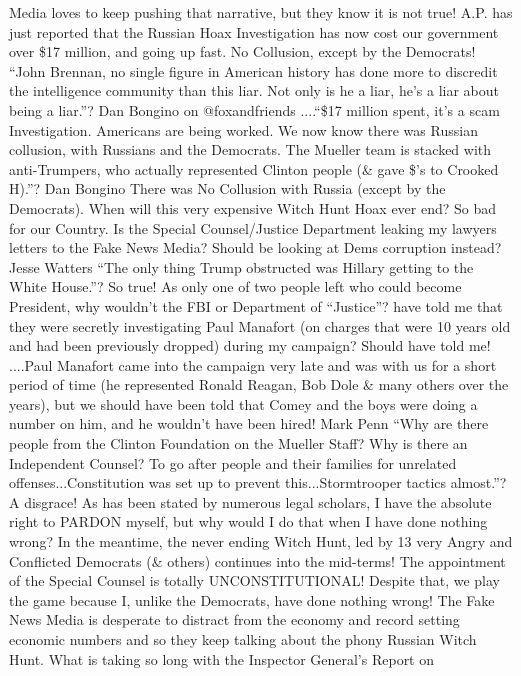 Media loves to keep pushing that narrative, but they know it is not
true! A.P. has just reported that the Russian Hoax Investigation has now
cost our government over \$17 million, and going up fast. No Collusion,
except by the Democrats! ``John Brennan, no single figure in American
history has done more to discredit the intelligence community than this
liar. Not only is he a liar, he's a liar about being a liar.''? Dan
Bongino on @foxandfriends ....``\$17 million spent, it's a scam
Investigation. Americans are being worked. We now know there was Russian
collusion, with Russians and the Democrats. The Mueller team is stacked
with anti-Trumpers, who actually represented Clinton people (\& gave
\$'s to Crooked H).''? Dan Bongino There was No Collusion with Russia
(except by the Democrats). When will this very expensive Witch Hunt Hoax
ever end? So bad for our Country. Is the Special Counsel/Justice
Department leaking my lawyers letters to the Fake News Media? Should be
looking at Dems corruption instead? Jesse Watters ``The only thing Trump
obstructed was Hillary getting to the White House.''? So true! As only
one of two people left who could become President, why wouldn't the FBI
or Department of ``Justice''? have told me that they were secretly
investigating Paul Manafort (on charges that were 10 years old and had
been previously dropped) during my campaign? Should have told me!
....Paul Manafort came into the campaign very late and was with us for a
short period of time (he represented Ronald Reagan, Bob Dole \& many
others over the years), but we should have been told that Comey and the
boys were doing a number on him, and he wouldn't have been hired! Mark
Penn ``Why are there people from the Clinton Foundation on the Mueller
Staff? Why is there an Independent Counsel? To go after people and their
families for unrelated offenses...Constitution was set up to prevent
this...Stormtrooper tactics almost.''? A disgrace! As has been stated by
numerous legal scholars, I have the absolute right to PARDON myself, but
why would I do that when I have done nothing wrong? In the meantime, the
never ending Witch Hunt, led by 13 very Angry and Conflicted Democrats
(\& others) continues into the mid-terms! The appointment of the Special
Counsel is totally UNCONSTITUTIONAL! Despite that, we play the game
because I, unlike the Democrats, have done nothing wrong! The Fake News
Media is desperate to distract from the economy and record setting
economic numbers and so they keep talking about the phony Russian Witch
Hunt. What is taking so long with the Inspector General's Report on

